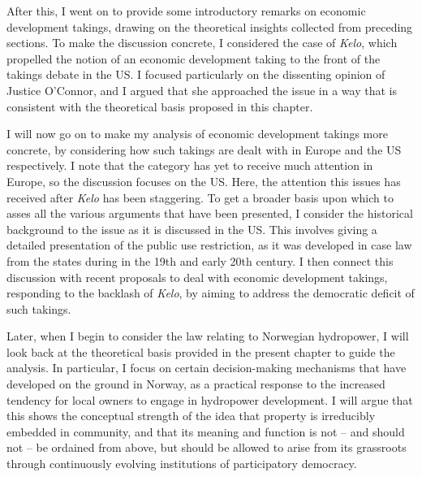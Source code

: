 After this, I went on to provide some introductory remarks on economic development takings, drawing on the theoretical insights collected from preceding sections. To make the discussion concrete, I considered the case of {\it Kelo}, which propelled the notion of an economic development taking to the front of the takings debate in the US. I focused particularly on the dissenting opinion of Justice O'Connor, and I argued that she approached the issue in a way that is consistent with the theoretical basis proposed in this chapter.

I will now go on to make my analysis of economic development takings more concrete, by considering how such takings are dealt with in Europe and the US respectively. I note that the category has yet to receive much attention in Europe, so the discussion focuses on the US. Here, the attention this issues has received after {\it Kelo} has been staggering. To get a broader basis upon which to asses all the various arguments that have been presented, I consider the historical background to the issue as it is discussed in the US. This involves giving a detailed presentation of the public use restriction, as it was developed in case law from the states during in the 19th and early 20th century. I then connect this discussion with recent proposals to deal with economic development takings, responding to the backlash of {\it Kelo}, by aiming to address the democratic deficit of such takings.

Later, when I begin to consider the law relating to Norwegian hydropower, I will look back at the theoretical basis provided in the present chapter to guide the analysis. In particular, I focus on certain decision-making mechanisms that have developed on the ground in Norway, as a practical response to the increased tendency for local owners to engage in hydropower development. I will argue that this shows the conceptual strength of the idea that property is irreducibly embedded in community, and that its meaning and function is not -- and should not -- be ordained from above, but should be allowed to arise from its grassroots through continuously evolving institutions of participatory democracy.


